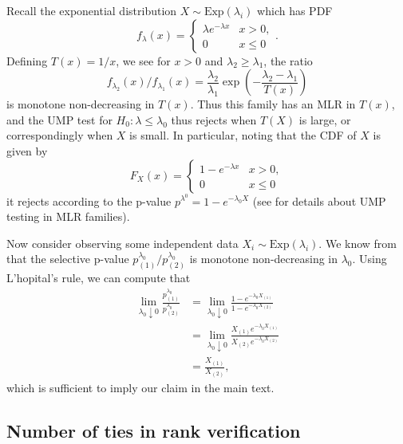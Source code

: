 \documentclass{article}
\begin{document}
\begin{appendix}
Recall the exponential distribution $X \sim \text{Exp}(\lambda_i)$ which has PDF
\begin{equation*}
    f_{\lambda}(x) = 
\begin{cases} 
\lambda e^{-\lambda x} & x > 0, \\ 
0 & x \leq 0 
\end{cases}.
\end{equation*}
Defining $T(x) = 1/x$, we see for $x > 0$ and $\lambda_2 \geq \lambda_1$, the ratio  
\begin{equation*}
   f_{\lambda_2}(x)/f_{\lambda_1}(x) = \frac{\lambda_2}{\lambda_1} \exp\left( - \frac{\lambda_2 - \lambda_1}{T(x)}\right)
\end{equation*}
is monotone non-decreasing in $T(x)$. Thus this family has an MLR in $T(x)$, and the UMP test for $H_0 : \lambda \leq \lambda_0$ thus rejects when $T(X)$ is large, or correspondingly when $X$ is small. In particular, noting that the CDF of $X$ is given by 
\begin{equation*}
F_X(x) = 
\begin{cases} 
1 - e^{-\lambda x} & x > 0, \\ 
0 & x \leq 0 
\end{cases}
\end{equation*}
it rejects according to the p-value $p^{\lambda^0} = 1 - e^{-\lambda_0 X}$ (see  for details about UMP testing in MLR families).

Now consider observing some independent data $X_i \sim \text{Exp}(\lambda_i)$. We know from  that the selective p-value $p^{\lambda_0}_{(1)}/p^{\lambda_0}_{(2)}$ is monotone non-decreasing in $\lambda_0$. Using L'hopital's rule, we can compute that 
\begin{align*}
    \lim_{\lambda_0 \downarrow 0} \frac{p^{\lambda_0}_{(1)}}{p^{\lambda_0}_{(2)}} &=  \lim_{\lambda_0 \downarrow 0}  \frac{1 - e^{-\lambda_0 X_{(1)}} }{1 - e^{-\lambda_0 X_{(2)}}}\\
    &= \lim_{\lambda_0 \downarrow 0} \frac{X_{(1)}e^{-\lambda_0 X_{(1)}}}{X_{(2)}e^{-\lambda_0 X_{(2)}}}\\
    &= \frac{X_{(1)}}{X_{(2)}},
\end{align*}
which is sufficient to imply our claim in the main text. 

\subsection{Number of ties in rank verification}
\label{sec:ties_appdx}


\end{appendix}
\end{document}

